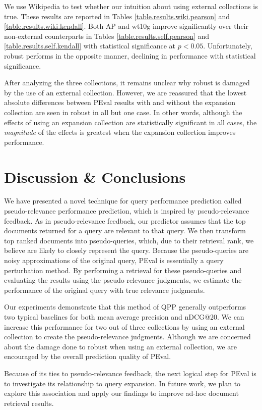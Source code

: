 \documentclass{sig-alternate}
\begin{document}

We use Wikipedia to test whether our intuition about using external collections is true. These results are reported in Tables \ref{table.results.wiki.pearson} and \ref{table.results.wiki.kendall}. Both AP and wt10g improve significantly over their non-external counterparts in Tables \ref{table.results.self.pearson} and \ref{table.results.self.kendall} with statistical significance at $p < 0.05$. Unfortunately, robust performs in the opposite manner, declining in performance with statistical significance.

After analyzing the three collections, it remains unclear why robust is damaged by the use of an external collection. However, we are reassured that the lowest absolute differences between PEval results with and without the expansion collection are seen in robust in all but one case. In other words, although the effects of using an expansion collection are statistically significant in all cases, the \textit{magnitude} of the effects is greatest when the expansion collection improves performance.

\section{Discussion \& Conclusions}\label{section.conclusions}

We have presented a novel technique for query performance prediction called pseudo-relevance performance prediction, which is inspired by pseudo-relevance feedback. As in pseudo-relevance feedback, our predictor assumes that the top documents returned for a query are relevant to that query. We then transform top ranked documents into pseudo-queries, which, due to their retrieval rank, we believe are likely to closely represent the query. Because the pseudo-queries are noisy approximations of the original query, PEval is essentially a query perturbation method. By performing a retrieval for these pseudo-queries and evaluating the results using the pseudo-relevance judgments, we estimate the performance of the original query with true relevance judgments.

Our experiments demonstrate that this method of QPP generally outperforms two typical baselines for both mean average precision and nDCG@20. We can increase this performance for two out of three collections by using an external collection to create the pseudo-relevance judgments. Although we are concerned about the damage done to robust when using an external collection, we are encouraged by the overall prediction quality of PEval.

Because of its ties to pseudo-relevance feedback, the next logical step for PEval is to investigate its relationship to query expansion. In future work, we plan to explore this association and apply our findings to improve ad-hoc document retrieval results.


  
\end{document}

